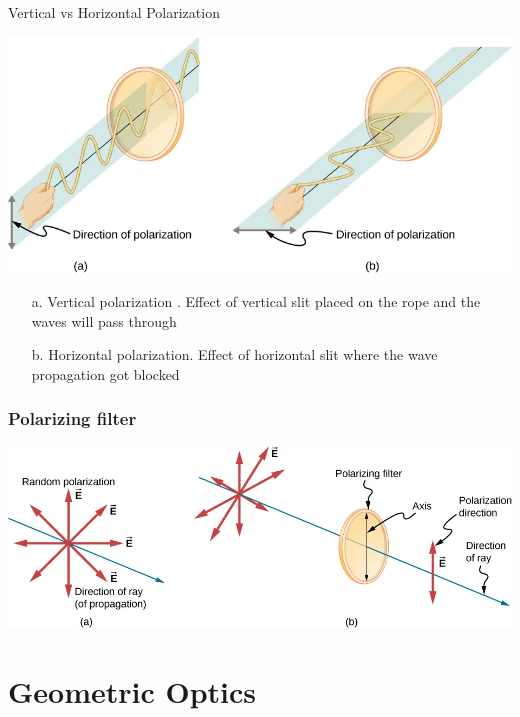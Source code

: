 \documentclass{beamer}
\begin{document}
\begin{frame}{Vertical vs Horizontal Polarization}
	\begin{center}
		\includegraphics[scale=0.3]{35.png}
	\end{center}
	\begin{enumerate}
		\item[a.] Vertical polarization . Effect of vertical slit placed on the rope and the waves will pass through
		\item[b.] Horizontal polarization. Effect of horizontal slit where the wave propagation got blocked 
	\end{enumerate}
\end{frame}

\begin{frame}
	\frametitle{Polarizing filter}
	\begin{center}
		\includegraphics[scale=0.3]{36.png}
	\end{center}
\end{frame}

\section{Geometric Optics}
\end{document}

